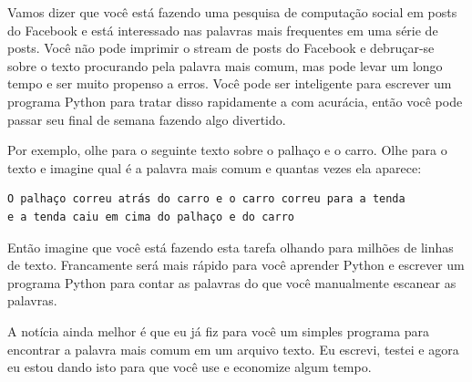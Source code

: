 Vamos dizer que você está fazendo uma pesquisa de computação social em posts 
do Facebook e está interessado nas palavras mais frequentes em uma série de posts.
Você não pode imprimir o stream de posts do Facebook e debruçar-se sobre o texto
procurando pela palavra mais comum, mas pode levar um longo tempo e ser muito
propenso a erros. Você pode ser inteligente para escrever um programa Python para
tratar disso rapidamente a com acurácia, então você pode passar seu final de semana
fazendo algo divertido.
%

Por exemplo, olhe para o seguinte texto sobre o palhaço e o carro. Olhe para o 
texto e imagine qual é a palavra mais comum e quantas vezes ela aparece: 
%

\beforeverb
\begin{verbatim}
O palhaço correu atrás do carro e o carro correu para a tenda
e a tenda caiu em cima do palhaço e do carro
\end{verbatim}
\afterverb

Então imagine que você está fazendo esta tarefa olhando para milhões de linhas
de texto. Francamente será mais rápido para você aprender Python e escrever um
programa Python para contar as palavras do que você manualmente escanear as 
palavras.
%

A notícia ainda melhor é que eu já fiz para você um simples programa para
encontrar a palavra mais comum em um arquivo texto. Eu escrevi, testei e agora
eu estou dando isto para que você use e economize algum tempo. 
%


